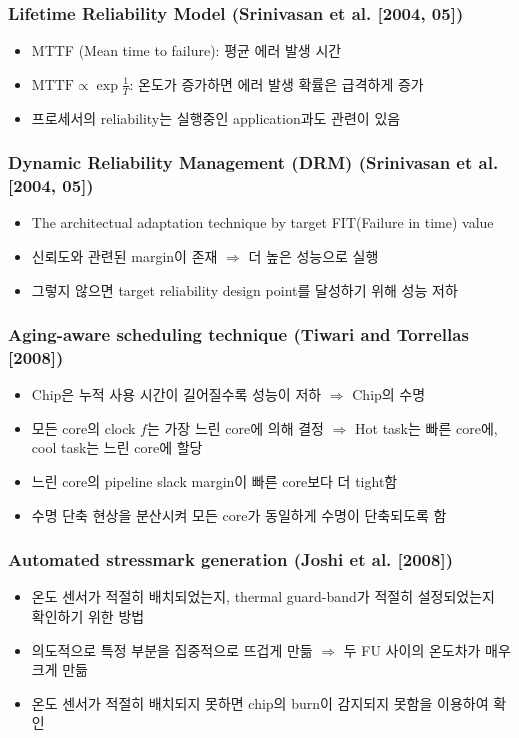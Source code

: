 \subsubsection*{Lifetime Reliability Model (Srinivasan et al. [2004, 05])}
\begin{itemize}
    \item MTTF (Mean time to failure): 평균 에러 발생 시간
    \item $\mathrm{MTTF} \varpropto \exp \frac{1}{T}$: 온도가 증가하면 에러 발생 확률은 급격하게 증가
    \item 프로세서의 reliability는 실행중인 application과도 관련이 있음
\end{itemize}

\subsubsection*{Dynamic Reliability Management (DRM) (Srinivasan et al. [2004, 05])}
\begin{itemize}
    \item The architectual adaptation technique by target FIT(Failure in time) value
    \item 신뢰도와 관련된 margin이 존재 $\Rightarrow$ 더 높은 성능으로 실행
    \item 그렇지 않으면 target reliability design point를 달성하기 위해 성능 저하
\end{itemize}

\subsubsection*{Aging-aware scheduling technique (Tiwari and Torrellas [2008])}
\begin{itemize}
    \item Chip은 누적 사용 시간이 길어질수록 성능이 저하 $\Rightarrow$ Chip의 수명
    \item 모든 core의 clock $f$는 가장 느린 core에 의해 결정 $\Rightarrow$ Hot task는 빠른 core에, cool task는 느린 core에 할당
    \item 느린 core의 pipeline slack margin이 빠른 core보다 더 tight함
    \item 수명 단축 현상을 분산시켜 모든 core가 동일하게 수명이 단축되도록 함
\end{itemize}

\subsubsection*{Automated stressmark generation (Joshi et al. [2008])}
\begin{itemize}
    \item 온도 센서가 적절히 배치되었는지, thermal guard-band가 적절히 설정되었는지 확인하기 위한 방법
    \item 의도적으로 특정 부분을 집중적으로 뜨겁게 만듦 $\Rightarrow$ 두 FU 사이의 온도차가 매우 크게 만듦
    \item 온도 센서가 적절히 배치되지 못하면 chip의 burn이 감지되지 못함을 이용하여 확인
\end{itemize}

